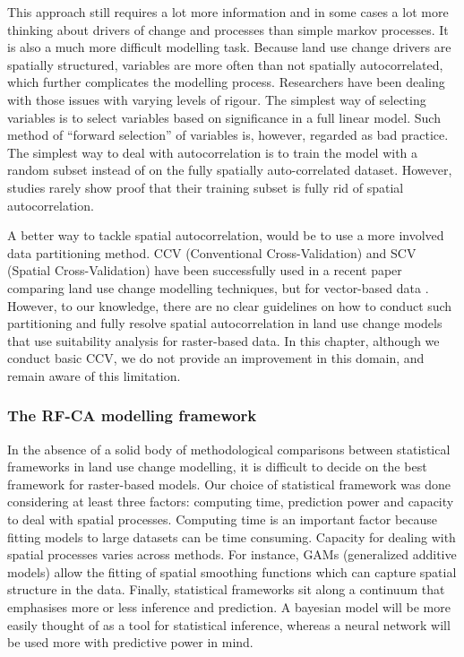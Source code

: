 This approach still requires a lot more information and in some cases a lot more thinking about drivers of change and processes than simple markov processes. It is also a much more difficult modelling task. Because land use change drivers are spatially structured, variables are more often than not spatially autocorrelated, which further complicates the modelling process. Researchers have been dealing with those issues with varying levels of rigour. The simplest way of selecting variables is to select variables based on significance in a full linear model. Such method of “forward selection” of variables is, however, regarded as bad practice. The simplest way to deal with autocorrelation is to train the model with a random subset instead of on the fully spatially auto-correlated dataset. However, studies rarely show proof that their training subset is fully rid of spatial autocorrelation.

A better way to tackle spatial autocorrelation, would be to use a more involved data partitioning method. CCV (Conventional Cross-Validation) and SCV (Spatial Cross-Validation) have been successfully used in a recent paper comparing land use change modelling techniques, but for vector-based data \citep{sun_comparison_2018}. However, to our knowledge, there are no clear guidelines on how to conduct such partitioning and fully resolve spatial autocorrelation in land use change models that use suitability analysis for raster-based data. In this chapter, although we conduct basic CCV, we do not provide an improvement in this domain, and remain aware of this limitation.\\

\subsubsection{The RF-CA modelling framework}

In the absence of a solid body of methodological comparisons between statistical frameworks in land use change modelling, it is difficult to decide on the best framework for raster-based models. Our choice of statistical framework was done considering at least three factors: computing time, prediction power and capacity to deal with spatial processes. Computing time is an important factor because fitting models to large datasets can be time consuming. Capacity for dealing with spatial processes varies across methods. For instance, GAMs (generalized additive models) allow the fitting of spatial smoothing functions which can capture spatial structure in the data. Finally, statistical frameworks sit along a continuum that emphasises more or less inference and prediction. A bayesian model will be more easily thought of as a tool for statistical inference, whereas a neural network will be used more with predictive power in mind.

